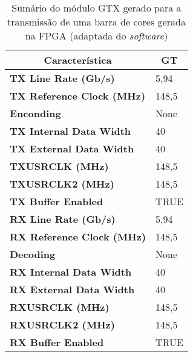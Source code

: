 \begin{table}[h!]
	\centering
	\begin{tabular}{@{}ll@{}}
		\toprule
		\multicolumn{1}{c}{\textbf{Característica}} & \multicolumn{1}{c}{\textbf{GT}} \\ \midrule
		\textbf{TX Line Rate (Gb/s)}                & 5,94                            \\
		\textbf{TX Reference Clock (MHz)}           & 148,5                           \\
		\textbf{Enconding}                          & None                            \\
		\textbf{TX Internal Data Width}             & 40                              \\
		\textbf{TX External Data Width}             & 40                              \\
		\textbf{TXUSRCLK (MHz)}                     & 148,5                           \\
		\textbf{TXUSRCLK2 (MHz)}                    & 148,5                           \\
		\textbf{TX Buffer Enabled}                  & TRUE                            \\
		\textbf{RX Line Rate (Gb/s)}                & 5,94                            \\
		\textbf{RX Reference Clock (MHz)}           & 148,5                           \\
		\textbf{Decoding}                           & None                            \\
		\textbf{RX Internal Data Width}             & 40                              \\
		\textbf{RX External Data Width}             & 40                              \\
		\textbf{RXUSRCLK (MHz)}                     & 148,5                           \\
		\textbf{RXUSRCLK2 (MHz)}                    & 148,5                           \\
		\textbf{RX Buffer Enabled}                  & TRUE                            \\ \bottomrule
	\end{tabular}
	\caption[Sumário do módulo GTX gerado para a transmissão de uma barra de cores gerada na FPGA]{Sumário do módulo GTX gerado para a transmissão de uma barra de cores gerada na FPGA (adaptada do \textit{software})}
	\label{table:sumario_planoD}
\end{table}

